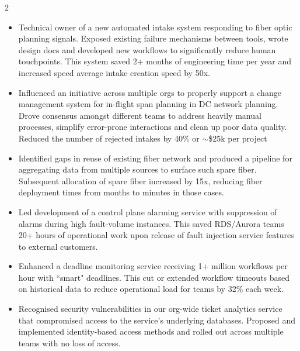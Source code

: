 \documentclass[10pt,a4paper,ragged2e]{altacv}
\begin{document}
\begin{paracol}{2}




	\begin{itemize}

		\item Technical owner of a new automated intake system responding to fiber optic planning signals. Exposed existing failure mechanisms between tools, wrote design docs and developed new workflows to significantly reduce human touchpoints.  This system saved 2+ months of engineering time per year and increased speed average intake creation speed by 50x.
		\item Influenced an initiative across multiple orgs to properly support a change management system for in-flight span planning in DC network planning. Drove consensus amongst different teams to address heavily manual processes, simplify error-prone interactions and clean up poor data quality. Reduced the number of rejected intakes by 40\% or $\sim$\$25k per project
		\item Identified gaps in reuse of existing fiber network and produced a pipeline for aggregating data from multiple sources to surface such spare fiber. Subsequent allocation of spare fiber increased by 15x, reducing fiber deployment times from months to minutes in those cases.

	\end{itemize}

	\divider

	\begin{itemize}

		\item Led development of a control plane alarming service with suppression of alarms during high fault-volume instances. This saved RDS/Aurora teams 20+ hours of operational work upon release of fault injection service features to external customers.
		\item Enhanced a deadline monitoring service receiving 1+ million workflows per hour  with ``smart" deadlines. This cut or extended workflow timeouts based on historical data to reduce operational load for teams by 32\% each week.
		\item Recognised security vulnerabilities in our org-wide ticket analytics service that compromised access to the service's underlying databases. Proposed and implemented identity-based access methods and rolled out across multiple teams with no loss of access.


\end{itemize}
\end{paracol}
\end{document}
